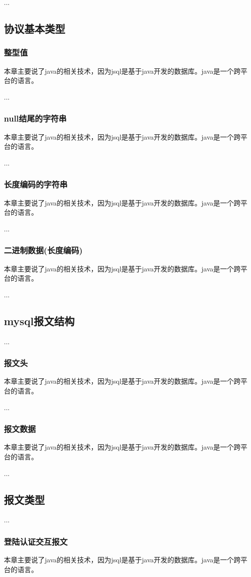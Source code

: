 ...
\subsection{协议基本类型}
\subsubsection*{整型值}
本章主要说了java的相关技术，因为jsql是基于java开发的数据库。java是一个跨平台的语言。

...
\subsubsection*{null结尾的字符串}
本章主要说了java的相关技术，因为jsql是基于java开发的数据库。java是一个跨平台的语言。

...
\subsubsection*{长度编码的字符串}
本章主要说了java的相关技术，因为jsql是基于java开发的数据库。java是一个跨平台的语言。

...
\subsubsection*{二进制数据(长度编码)}
本章主要说了java的相关技术，因为jsql是基于java开发的数据库。java是一个跨平台的语言。

...
\subsection{mysql报文结构}
...
\subsubsection*{报文头}
本章主要说了java的相关技术，因为jsql是基于java开发的数据库。java是一个跨平台的语言。

...
\subsubsection*{报文数据}
本章主要说了java的相关技术，因为jsql是基于java开发的数据库。java是一个跨平台的语言。

...
\subsection{报文类型}
...
\subsubsection*{登陆认证交互报文}
本章主要说了java的相关技术，因为jsql是基于java开发的数据库。java是一个跨平台的语言。

